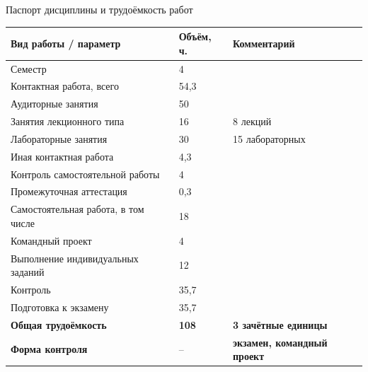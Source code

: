 \documentclass[aspectratio=169,10pt]{beamer}
\begin{document}
\begin{frame}{Паспорт дисциплины и трудоёмкость работ}
\scriptsize
\begin{adjustbox}{max width=\textwidth,max totalheight=0.83\textheight,center}
\begin{tabular}{L{9.6cm} C{2.1cm} L{3.8cm}}
\toprule
\textbf{Вид работы / параметр} & \textbf{Объём, ч.} & \textbf{Комментарий} \\
\midrule
Семестр & 4 &  \\
Контактная работа, всего & 54,3 &  \\
\quad Аудиторные занятия & 50 &  \\
\quad\quad Занятия лекционного типа & 16 & 8 лекций \\
\quad\quad Лабораторные занятия & 30 & 15 лабораторных \\
\quad Иная контактная работа & 4,3 &  \\
\quad\quad Контроль самостоятельной работы & 4 &  \\
\quad\quad Промежуточная аттестация & 0,3 &  \\
Самостоятельная работа, в том числе & 18 &  \\
\quad Командный проект & 4 &  \\
\quad Выполнение индивидуальных заданий & 12 &  \\
Контроль & 35,7 &  \\
\quad Подготовка к экзамену & 35,7 &  \\
\midrule
\textbf{Общая трудоёмкость} & \textbf{108} & \textbf{3 зачётные единицы} \\
\textbf{Форма контроля} & -- & \textbf{экзамен, командный проект} \\
\bottomrule
\end{tabular}
\end{adjustbox}
\end{frame}
\end{document}
